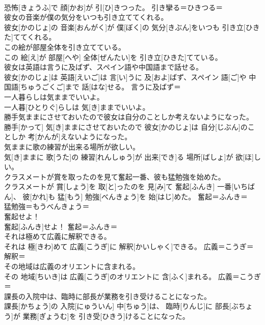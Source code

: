 \documentclass[8pt]{extreport}
\begin{document}
\begin{CJK}{UTF8}{min}
\\	恐怖[きょうふ]で 顔[かお]が 引[ひ]きつった。	引き攣る＝ひきつる＝ 
\\	彼女の音楽が僕の気分をいつも引き立ててくれる。	
\\	彼女[かのじょ]の 音楽[おんがく]が 僕[ぼく]の 気分[きぶん]をいつも 引き立[ひきた]ててくれる。	
\\	この絵が部屋全体を引き立てている。	
\\	この 絵[え]が 部屋[へや] 全体[ぜんたい]を 引き立[ひきた]てている。	
\\	彼女は英語は言うに及ばず、スペイン語や中国語まで話せる。	
\\	彼女[かのじょ]は 英語[えいご]は 言[い]うに 及[およ]ばず、スペイン 語[ご]や 中国語[ちゅうごくご]まで 話[はな]せる。	言うに及ばず＝ 
\\	一人暮らしは気ままでいいよ。	
\\	一人暮[ひとりぐ]らしは 気[き]ままでいいよ。	
\\	勝手気ままにさせておいたので彼女は自分のことしか考えないようになった。	
\\	勝手[かって] 気[き]ままにさせておいたので 彼女[かのじょ]は 自分[じぶん]のことしか 考[かんが]えないようになった。	
\\	気ままに歌の練習が出来る場所が欲しい。	
\\	気[き]ままに 歌[うた]の 練習[れんしゅう]が 出来[でき]る 場所[ばしょ]が 欲[ほ]しい。	
\\	クラスメートが賞を取ったのを見て奮起一番、彼も猛勉強を始めた。	
\\	クラスメートが 賞[しょう]を 取[と]ったのを 見[み]て 奮起[ふんき] 一番[いちばん]、 彼[かれ]も 猛[もう] 勉強[べんきょう]を 始[はじ]めた。	奮起＝ふんき＝ 
\\	猛勉強＝もうべんきょう＝ 
\\	奮起せよ！	
\\	奮起[ふんき]せよ！	奮起＝ふんき＝ 
\\	それは極めて広義に解釈できる。	
\\	それは 極[きわ]めて 広義[こうぎ]に 解釈[かいしゃく]できる。	広義＝こうぎ＝ 
\\	解釈＝ 
\\	その地域は広義のオリエントに含まれる。	
\\	その 地域[ちいき]は 広義[こうぎ]のオリエントに 含[ふく]まれる。	広義＝こうぎ＝ 
\\	課長の入院中は、臨時に部長が業務を引き受けることになった。	
\\	課長[かちょう]の 入院[にゅういん] 中[ちゅう]は、 臨時[りんじ]に 部長[ぶちょう]が 業務[ぎょうむ]を 引き受[ひきう]けることになった。	

\end{CJK}
\end{document}

